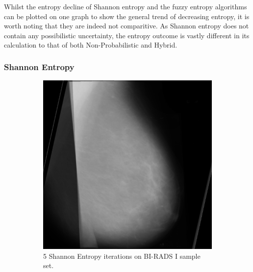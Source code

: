 Whilst the entropy decline of Shannon entropy and the fuzzy entropy algorithms can be plotted on one graph to show the general trend of decreasing entropy, it is worth noting that they are indeed not comparitive. As Shannon entropy does not contain any possibilistic uncertainty, the entropy outcome is vastly different in its calculation to that of both Non-Probabilistic and Hybrid.

\newpage
\subsubsection{Shannon Entropy}

\begin{figure}[H]
    \centering
    \begin{subfigure}[t]{0.3\textwidth}
        \includegraphics[width=\textwidth]{Chapter3/shannon-img/s-5-final.png}
        \caption{5 Shannon Entropy iterations on BI-RADS I sample set.}
        \label{fig:5-shannon}
    \end{subfigure} \hfill
    ~ %
    \begin{subfigure}[t]{0.3\textwidth}

\end{subfigure}
\end{figure}
